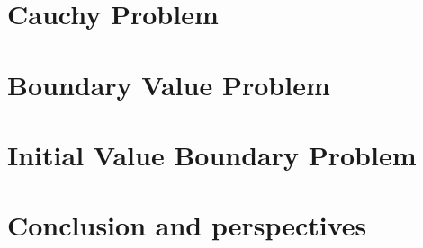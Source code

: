 \documentclass[11pt,twoside,a4paper]{book}
\begin{document}
\newpage
\chapter{Cauchy Problem}


\newpage
\chapter{Boundary Value Problem}


\newpage
\chapter{Initial Value Boundary Problem}



\newpage
\chapter*{Conclusion and perspectives}



\newpage
\listoffigures
{}

\newpage
\printindex
{}
\end{document}
